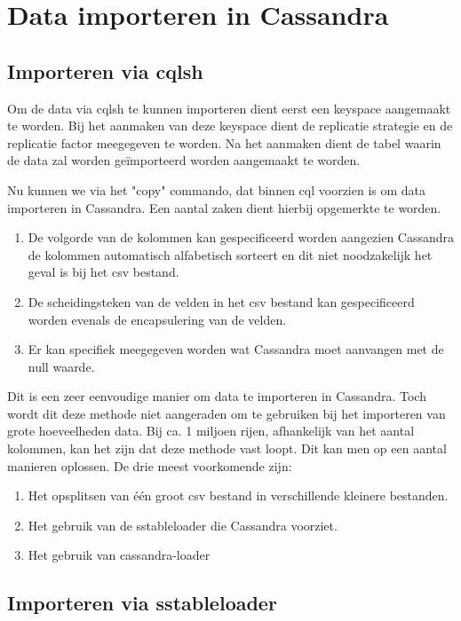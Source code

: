 \chapter{Data importeren in Cassandra}
\label{ch:cassandra_import}

\section{Importeren via cqlsh}
Om de data via cqlsh te kunnen importeren dient eerst een keyspace aangemaakt te worden.
Bij het aanmaken van deze keyspace dient de replicatie strategie en de replicatie factor meegegeven te worden.
Na het aanmaken dient de tabel waarin de data zal worden geïmporteerd worden aangemaakt te worden.

Nu kunnen we via het "copy" commando, dat binnen cql voorzien is om data importeren in Cassandra.
Een aantal zaken dient hierbij opgemerkte te worden.

\begin{enumerate}
	\item De volgorde van de kolommen kan gespecificeerd worden aangezien Cassandra de kolommen automatisch alfabetisch sorteert en dit niet noodzakelijk het geval is bij het csv bestand.
	\item De scheidingsteken van de velden in het csv bestand kan gespecificeerd worden evenals de encapsulering van de velden.
	\item Er kan specifiek meegegeven worden wat Cassandra moet aanvangen met de null waarde.
\end{enumerate}

Dit is een zeer eenvoudige manier om data te importeren in Cassandra.
Toch wordt dit deze methode niet aangeraden om te gebruiken bij het importeren van grote hoeveelheden data.
Bij ca. 1 miljoen rijen, afhankelijk van het aantal kolommen, kan het zijn dat deze methode vast loopt.
Dit kan men op een aantal manieren oplossen.
De drie meest voorkomende zijn:

\begin{enumerate}
	\item Het opsplitsen van één groot csv bestand in verschillende kleinere bestanden.
	\item Het gebruik van de sstableloader die Cassandra voorziet.
	\item Het gebruik van cassandra-loader
\end{enumerate}

\section{Importeren via sstableloader}


